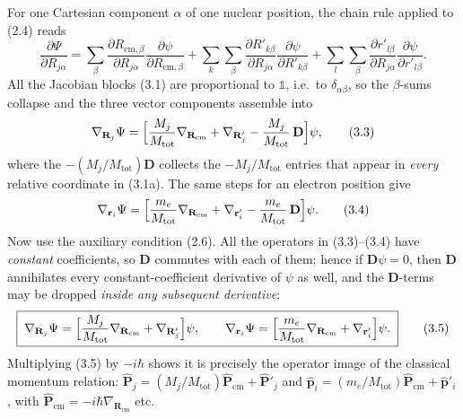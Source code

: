 \documentclass{article}
\begin{document}
For one Cartesian component $\alpha$ of one nuclear position, the chain rule applied to (2.4) reads
\begin{equation}
\frac{\partial\Psi}{\partial R_{j\alpha}}
=\sum_\beta\frac{\partial R_{\mathrm{cm},\beta}}{\partial R_{j\alpha}}\frac{\partial\psi}{\partial R_{\mathrm{cm},\beta}}
+\sum_k\sum_\beta\frac{\partial R'_{k\beta}}{\partial R_{j\alpha}}\frac{\partial\psi}{\partial R'_{k\beta}}
+\sum_l\sum_\beta\frac{\partial r'_{l\beta}}{\partial R_{j\alpha}}\frac{\partial\psi}{\partial r'_{l\beta}}. \tag{3.2}
\end{equation}
All the Jacobian blocks (3.1) are proportional to $\mathbb{1}$, i.e.\ to $\delta_{\alpha\beta}$, so the $\beta$-sums collapse and the three vector components assemble into
\begin{equation}
\nabla_{\mathbf{R}_j}\Psi=\Bigl[\frac{M_j}{M_{\mathrm{tot}}}\nabla_{\mathbf{R}_{\mathrm{cm}}}+\nabla_{\mathbf{R}'_j}-\frac{M_j}{M_{\mathrm{tot}}}\,\mathbf{D}\Bigr]\psi, \tag{3.3}
\end{equation}
where the $-({M_j}/{M_{\mathrm{tot}}})\mathbf{D}$ collects the $-M_j/M_{\mathrm{tot}}$ entries that appear in \emph{every} relative coordinate in (3.1a). The same steps for an electron position give
\begin{equation}
\nabla_{\mathbf{r}_i}\Psi=\Bigl[\frac{m_e}{M_{\mathrm{tot}}}\nabla_{\mathbf{R}_{\mathrm{cm}}}+\nabla_{\mathbf{r}'_i}-\frac{m_e}{M_{\mathrm{tot}}}\,\mathbf{D}\Bigr]\psi. \tag{3.4}
\end{equation}
Now use the auxiliary condition (2.6). All the operators in (3.3)--(3.4) have \emph{constant} coefficients, so $\mathbf{D}$ commutes with each of them; hence if $\mathbf{D}\psi=0$, then $\mathbf{D}$ annihilates every constant-coefficient derivative of $\psi$ as well, and the $\mathbf{D}$-terms may be dropped \emph{inside any subsequent derivative}:
\begin{equation}
\boxed{\;\nabla_{\mathbf{R}_j}\Psi=\Bigl[\frac{M_j}{M_{\mathrm{tot}}}\nabla_{\mathbf{R}_{\mathrm{cm}}}+\nabla_{\mathbf{R}'_j}\Bigr]\psi,\qquad
\nabla_{\mathbf{r}_i}\Psi=\Bigl[\frac{m_e}{M_{\mathrm{tot}}}\nabla_{\mathbf{R}_{\mathrm{cm}}}+\nabla_{\mathbf{r}'_i}\Bigr]\psi.\;} \tag{3.5}
\end{equation}
Multiplying (3.5) by $-i\hbar$ shows it is precisely the operator image of the classical momentum relation: $\hat{\mathbf{P}}_j=({M_j}/{M_{\mathrm{tot}}})\hat{\mathbf{P}}_{\mathrm{cm}}+\hat{\mathbf{P}}'_j$ and $\hat{\mathbf{p}}_i=({m_e}/{M_{\mathrm{tot}}})\hat{\mathbf{P}}_{\mathrm{cm}}+\hat{\mathbf{p}}'_i$, with $\hat{\mathbf{P}}_{\mathrm{cm}}=-i\hbar\nabla_{\mathbf{R}_{\mathrm{cm}}}$ etc.
\end{document}
